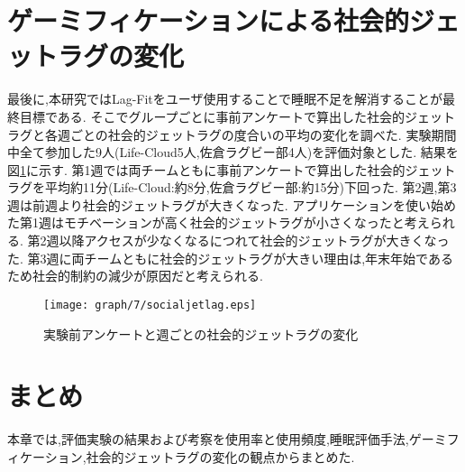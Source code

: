 \begin{table}[htbp]
	\begin{center}
 	\end{center}
 	\caption{最終アンケート:睡眠データの公開相手ごとの抵抗}
 	\label{privacy2}
\end{table}

\newpage
\section{ゲーミフィケーションによる社会的ジェットラグの変化}
最後に,本研究ではLag-Fitをユーザ使用することで睡眠不足を解消することが最終目標である.
そこでグループごとに事前アンケートで算出した社会的ジェットラグと各週ごとの社会的ジェットラグの度合いの平均の変化を調べた.
実験期間中全て参加した9人(Life-Cloud5人,佐倉ラグビー部4人)を評価対象とした.
結果を図\ref{graph5}に示す.
第1週では両チームともに事前アンケートで算出した社会的ジェットラグを平均約11分(Life-Cloud:約8分,佐倉ラグビー部:約15分)下回った.
第2週,第3週は前週より社会的ジェットラグが大きくなった.
アプリケーションを使い始めた第1週はモチベーションが高く社会的ジェットラグが小さくなったと考えられる.
第2週以降アクセスが少なくなるにつれて社会的ジェットラグが大きくなった.
第3週に両チームともに社会的ジェットラグが大きい理由は,年末年始であるため社会的制約の減少が原因だと考えられる.
\begin{figure}[tbp]
	\begin{center}
		\texttt{[image: graph/7/socialjetlag.eps]}
		\caption{実験前アンケートと週ごとの社会的ジェットラグの変化}
		\label{graph5}
	\end{center}
\end{figure}


\section{まとめ}
本章では,評価実験の結果および考察を使用率と使用頻度,睡眠評価手法,ゲーミフィケーション,社会的ジェットラグの変化の観点からまとめた.

